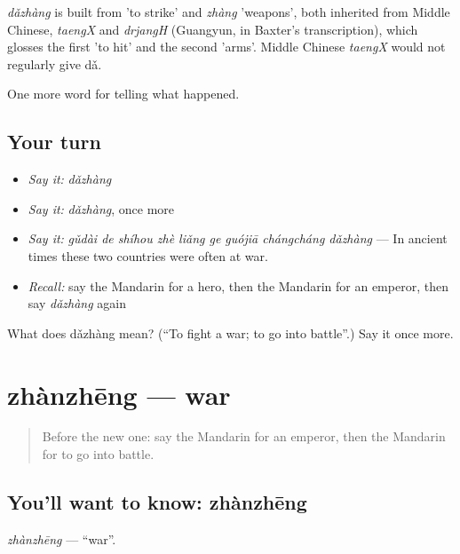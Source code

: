 \begin{cousinweb}
\emph{dǎzhàng} is built from  'to strike' and \emph{zhàng} 'weapons', both inherited from Middle Chinese, \emph{taengX} and \emph{drjangH} (Guangyun, in Baxter's transcription), which glosses the first 'to hit' and the second 'arms'. Middle Chinese \emph{taengX} would not regularly give dǎ.
\end{cousinweb}

\begin{grammarlens}[title={What you've built}]
One more word for telling what happened.
\end{grammarlens}

\subsection*{Your turn}
\begin{itemize}
\raggedright
  \item \emph{Say it:} \emph{dǎzhàng}
  \item \emph{Say it:} \emph{dǎzhàng}, once more
  \item \emph{Say it:} \emph{gǔdài de shíhou zhè liǎng ge guójiā chángcháng dǎzhàng} — In ancient times these two countries were often at war.
  \item \emph{Recall:} say the Mandarin for a hero, then the Mandarin for an emperor, then say \emph{dǎzhàng} again
\end{itemize}

\begin{tcolorbox}[breakable,colback=teal!4,colframe=teal!35!black,title={Before you move on}]
What does dǎzhàng mean? (\textquotedblleft{}To fight a war; to go into battle\textquotedblright{}.) Say it once more.
\end{tcolorbox}
\section[zhànzhēng]{zhànzhēng — war}

\label{lesson:ZH-C327-zhanzheng}



\begin{quote}
Before the new one: say the Mandarin for an emperor, then the Mandarin for to go into battle.
\end{quote}

\subsection*{You'll want to know: zhànzhēng}
\emph{zhànzhēng} — \textquotedblleft{}war\textquotedblright{}.

